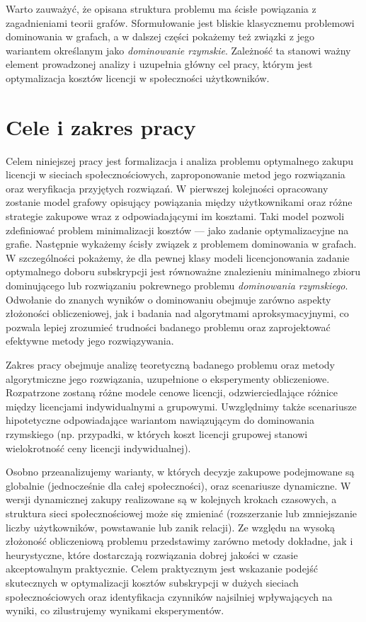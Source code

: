 Warto zauważyć, że opisana struktura problemu ma ścisłe powiązania z zagadnieniami teorii grafów. Sformułowanie jest bliskie klasycznemu problemowi dominowania w grafach, a w dalszej części pokażemy też związki z jego wariantem określanym jako \emph{dominowanie rzymskie}. Zależność ta stanowi ważny element prowadzonej analizy i uzupełnia główny cel pracy, którym jest optymalizacja kosztów licencji w społeczności użytkowników.

\section{Cele i zakres pracy}
Celem niniejszej pracy jest formalizacja i analiza problemu optymalnego zakupu licencji w sieciach społecznościowych, zaproponowanie metod jego rozwiązania oraz weryfikacja przyjętych rozwiązań. W pierwszej kolejności opracowany zostanie model grafowy opisujący powiązania między użytkownikami oraz różne strategie zakupowe wraz z odpowiadającymi im kosztami. Taki model pozwoli zdefiniować problem minimalizacji kosztów --- jako zadanie optymalizacyjne na grafie. Następnie wykażemy ścisły związek z problemem dominowania w grafach. W szczególności pokażemy, że dla pewnej klasy modeli licencjonowania zadanie optymalnego doboru subskrypcji jest równoważne znalezieniu minimalnego zbioru dominującego lub rozwiązaniu pokrewnego problemu \emph{dominowania rzymskiego}. Odwołanie do znanych wyników o dominowaniu obejmuje zarówno aspekty złożoności obliczeniowej, jak i badania nad algorytmami aproksymacyjnymi, co pozwala lepiej zrozumieć trudności badanego problemu oraz zaprojektować efektywne metody jego rozwiązywania.

Zakres pracy obejmuje analizę teoretyczną badanego problemu oraz metody algorytmiczne jego rozwiązania, uzupełnione o eksperymenty obliczeniowe. Rozpatrzone zostaną różne modele cenowe licencji, odzwierciedlające różnice między licencjami indywidualnymi a grupowymi. Uwzględnimy także scenariusze hipotetyczne odpowiadające wariantom nawiązującym do dominowania rzymskiego (np. przypadki, w których koszt licencji grupowej stanowi wielokrotność ceny licencji indywidualnej).

Osobno przeanalizujemy warianty, w których decyzje zakupowe podejmowane są globalnie (jednocześnie dla całej społeczności), oraz scenariusze dynamiczne. W wersji dynamicznej zakupy realizowane są w kolejnych krokach czasowych, a struktura sieci społecznościowej może się zmieniać (rozszerzanie lub zmniejszanie liczby użytkowników, powstawanie lub zanik relacji). Ze względu na wysoką złożoność obliczeniową problemu przedstawimy zarówno metody dokładne, jak i heurystyczne, które dostarczają rozwiązania dobrej jakości w czasie akceptowalnym praktycznie. Celem praktycznym jest wskazanie podejść skutecznych w optymalizacji kosztów subskrypcji w dużych sieciach społecznościowych oraz identyfikacja czynników najsilniej wpływających na wyniki, co zilustrujemy wynikami eksperymentów.

